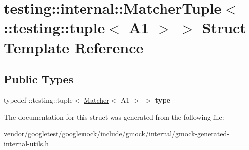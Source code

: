\hypertarget{structtesting_1_1internal_1_1_matcher_tuple_3_01_1_1testing_1_1tuple_3_01_a1_01_4_01_4}{}\section{testing\+:\+:internal\+:\+:Matcher\+Tuple$<$ \+:\+:testing\+:\+:tuple$<$ A1 $>$ $>$ Struct Template Reference}
\label{structtesting_1_1internal_1_1_matcher_tuple_3_01_1_1testing_1_1tuple_3_01_a1_01_4_01_4}
\subsection*{Public Types}
\begin{DoxyCompactItemize}
\item 
\mbox{\label{structtesting_1_1internal_1_1_matcher_tuple_3_01_1_1testing_1_1tuple_3_01_a1_01_4_01_4_a8463ac100366f7e8b6ad1035e42ec4b0}} 
typedef \+::testing\+::tuple$<$ \hyperlink{classtesting_1_1_matcher}{Matcher}$<$ A1 $>$ $>$ {\bfseries type}
\end{DoxyCompactItemize}


The documentation for this struct was generated from the following file\+:\begin{DoxyCompactItemize}
\item 
vendor/googletest/googlemock/include/gmock/internal/gmock-\/generated-\/internal-\/utils.\+h\end{DoxyCompactItemize}
